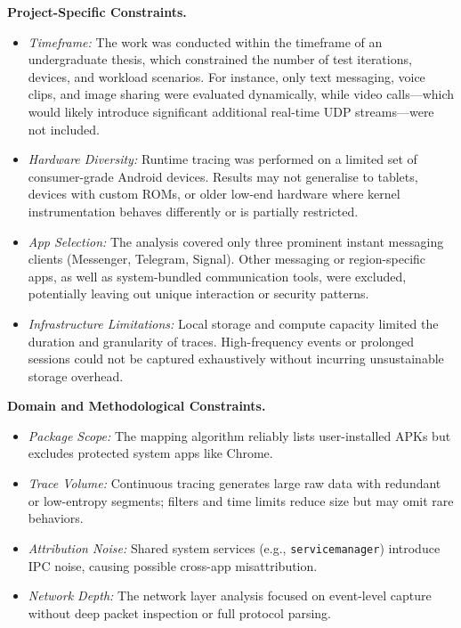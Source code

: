 \documentclass[a4paper,12pt]{report}
\begin{document}
\textbf{Project-Specific Constraints.}

\begin{itemize}
\item \textit{Timeframe:} The work was conducted within the timeframe of an undergraduate thesis, which constrained the number of test iterations, devices, and workload scenarios. For instance, only text messaging, voice clips, and image sharing were evaluated dynamically, while video calls—which would likely introduce significant additional real-time UDP streams—were not included.
\item \textit{Hardware Diversity:} Runtime tracing was performed on a limited set of consumer-grade Android devices. Results may not generalise to tablets, devices with custom ROMs, or older low-end hardware where kernel instrumentation behaves differently or is partially restricted.
\item \textit{App Selection:} The analysis covered only three prominent instant messaging clients (Messenger, Telegram, Signal). Other messaging or region-specific apps, as well as system-bundled communication tools, were excluded, potentially leaving out unique interaction or security patterns.
\item \textit{Infrastructure Limitations:} Local storage and compute capacity limited the duration and granularity of traces. High-frequency events or prolonged sessions could not be captured exhaustively without incurring unsustainable storage overhead.
\end{itemize}



\textbf{Domain and Methodological Constraints.}
\begin{itemize}
\item \textit{Package Scope:} The mapping algorithm reliably lists user-installed APKs but excludes protected system apps like Chrome.

\item \textit{Trace Volume:} Continuous tracing generates large raw data with redundant or low-entropy segments; filters and time limits reduce size but may omit rare behaviors.
\item \textit{Attribution Noise:} Shared system services (e.g., \texttt{servicemanager}) introduce IPC noise, causing possible cross-app misattribution.
\item \textit{Network Depth:} The network layer analysis focused on event-level capture without deep packet inspection or full protocol parsing.
\end{itemize}
\end{document}
